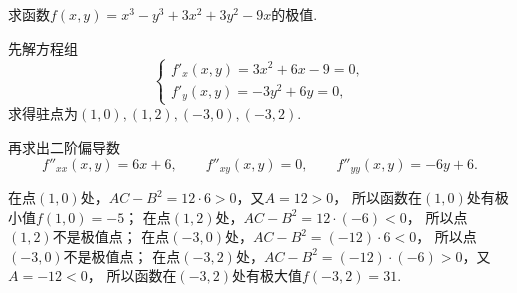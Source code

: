 \begin{example}
求函数\(f(x,y) = x^3-y^3+3x^2+3y^2-9x\)的极值.
\begin{solution}
先解方程组\begin{equation*}
	\left\{ \begin{array}{l}
		f'_x(x,y) = 3x^2+6x-9 = 0, \\
		f'_y(x,y) = -3y^2+6y = 0,
	\end{array} \right.
\end{equation*}
求得驻点为\((1,0),(1,2),(-3,0),(-3,2)\).

再求出二阶偏导数\begin{equation*}
	f''_{xx}(x,y) = 6x+6,
	\qquad
	f''_{xy}(x,y) = 0,
	\qquad
	f''_{yy}(x,y) = -6y+6.
\end{equation*}

在点\((1,0)\)处，\(AC-B^2=12\cdot6>0\)，又\(A=12>0\)，
所以函数在\((1,0)\)处有极小值\(f(1,0)=-5\)；
在点\((1,2)\)处，\(AC-B^2=12\cdot(-6)<0\)，
所以点\((1,2)\)不是极值点；
在点\((-3,0)\)处，\(AC-B^2=(-12)\cdot6<0\)，
所以点\((-3,0)\)不是极值点；
在点\((-3,2)\)处，\(AC-B^2=(-12)\cdot(-6)>0\)，又\(A=-12<0\)，
所以函数在\((-3,2)\)处有极大值\(f(-3,2)=31\).
\end{solution}
\end{example}

